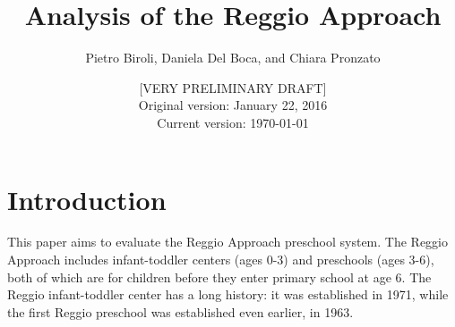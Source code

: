 \documentclass[12pt]{article}
\begin{document}
\title{Analysis of the Reggio Approach} %
\author{Pietro Biroli, Daniela Del Boca, and Chiara Pronzato}
\date{[VERY PRELIMINARY DRAFT] \\
Original version: January 22, 2016 \\
Current version: \today }

\maketitle



\bigskip

\doublespacing

\section{Introduction}\label{sec:intro}

This paper aims to evaluate the Reggio Approach preschool system. The Reggio Approach includes infant-toddler centers (ages 0-3) and preschools (ages 3-6), both of which are for children before they enter primary school at age 6. The Reggio infant-toddler center has a long history: it was established in 1971, while the first Reggio preschool was established even earlier, in 1963.
\end{document}
